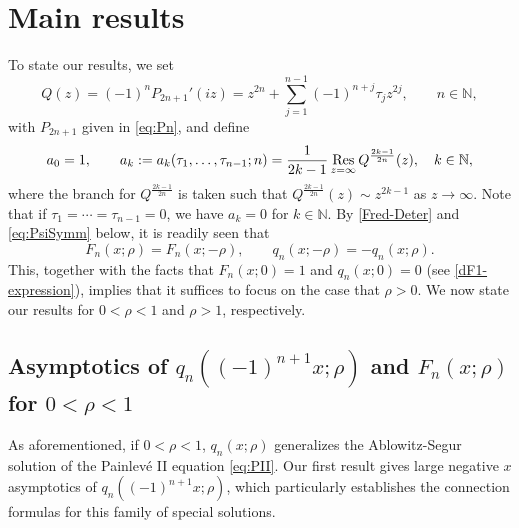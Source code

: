 \documentclass[11pt,a4paper]{article}
\numberwithin{equation}{section}
\def\Res {\mathop{\rm Res}\nolimits}
\begin{document}
\section{Main results}
To state our results, we set
\begin{equation}\label{ell}
Q(z)=(-1)^nP_{2n+1}'(iz)=z^{2n}+\sum_{j=1}^{n-1}(-1)^{n+j} \tau_j z^{2j}, \qquad n\in\mathbb{N},
\end{equation}
with $P_{2n+1}$ given in \eqref{eq:Pn}, and define
\begin{equation}\label{ak-expression}
a_0=1,\qquad a_{k}:=a_{k}(\tau_1,\ldots,\tau_{n-1};n)=\frac{1}{2k-1} \Res \limits_{z=\infty}Q^{\frac{2k-1}{2n}}(z), \quad k\in \mathbb{N},
\end{equation}%
where the branch for $Q^{\frac{2k-1}{2n}}$ is taken such that $Q^{\frac{2k-1}{2n}}(z)\sim z^{2k-1} $ as $z\to\infty$. Note that if $\tau_1=\cdots=\tau_{n-1}=0$, we have $a_k=0$ for $k\in \mathbb{N}$. By \eqref{Fred-Deter} and \eqref{eq:PsiSymm} below, it is readily seen that
\begin{equation}\label{symmetry}
F_n(x;\rho)=F_{n}(x;-\rho),\qquad q_{n}(x;-\rho)=-q_{n}(x;\rho).
\end{equation}
This, together with the facts that $F_n(x;0)=1$ and $q_{n}(x;0)=0$ (see \eqref{dF1-expression}), implies that it suffices to focus on the case that $\rho>0$. We now state our results for $0<\rho<1$ and $\rho >1$, respectively.


\subsection{Asymptotics of $q_n((-1)^{n+1}x;\rho)$ and $F_n(x;\rho)$ for $0< \rho<1$}
As aforementioned, if $0<\rho<1$, $q_n(x;\rho)$ generalizes the Ablowitz-Segur solution of the Painlev\'{e} II equation \eqref{eq:PII}. Our first result gives large negative $x$ asymptotics of  $q_{n}\left((-1)^{n+1}x;\rho\right)$, which particularly establishes the connection formulas for this family of special solutions.
\end{document}

